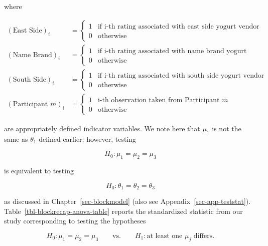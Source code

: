 \documentclass[
  letterpaper,
  DIV=11,
  numbers=noendperiod]{scrreprt}
\theoremstyle{definition}
\theoremstyle{definition}
\theoremstyle{plain}
\theoremstyle{remark}
\begin{document}
where

\[
\begin{aligned}
  (\text{East Side})_i &= \begin{cases}
    1 & \text{if i-th rating associated with east side yogurt vendor} \\
    0 & \text{otherwise}
    \end{cases} \\
  (\text{Name Brand})_i &= \begin{cases}
    1 & \text{if i-th rating associated with name brand yogurt vendor} \\
    0 & \text{otherwise}
    \end{cases} \\
  (\text{South Side})_i &= \begin{cases}
    1 & \text{if i-th rating associated with south side yogurt vendor} \\
    0 & \text{otherwise}
    \end{cases} \\
  (\text{Participant } m)_i &= \begin{cases}
    1 & \text{i-th observation taken from Participant } m \\
    0 & \text{otherwise}
    \end{cases}
\end{aligned}
\]

are appropriately defined indicator variables. We note here that
\(\mu_1\) is not the same as \(\theta_1\) defined earlier; however,
testing

\[H_0: \mu_1 = \mu_2 = \mu_3\]

is equivalent to testing

\[H_0: \theta_1 = \theta_2 = \theta_3\]

as discussed in Chapter~\ref{sec-blockmodel} (also see
Appendix~\ref{sec-app-teststat}). Table~\ref{tbl-blockrecap-anova-table}
reports the standardized statistic from our study corresponding to
testing the hypotheses

\[H_0: \mu_1 = \mu_2 = \mu_3 \qquad \text{vs.} \qquad H_1: \text{at least one } \mu_j \text{ differs.}\]

\begin{table}

\caption{\label{tbl-blockrecap-anova-table}ANOVA table summarizing the
comparison of the appearance ratings of frozen yogurt across three
vendors from the Frozen Yogurt Case Study.}


\end{table}%
\end{document}
